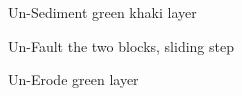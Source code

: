 \documentclass[12pt, a4paper]{report} %
\begin{document}
\begin{center}
\begin{figure}[H]
\begin{subfigure}[b]{.45\linewidth}
	\caption{Un-Sediment green khaki layer}
	\end{subfigure}
	\begin{subfigure}[b]{.45\linewidth}
	\centering
	\caption{Un-Fault the two blocks, sliding step}
	\end{subfigure}
	\begin{subfigure}[b]{.45\linewidth}
	\centering
	\caption{Un-Erode green layer}
	\end{subfigure}
	\begin{subfigure}[b]{.45\linewidth}
	\centering

\end{subfigure}
\end{figure}
\end{center}
\end{document}
